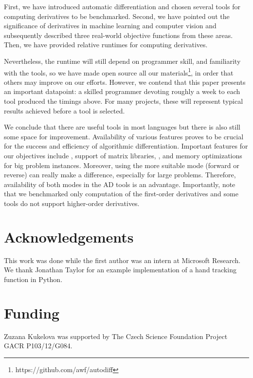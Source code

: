 \documentclass[suppldata]{article}
\begin{document}
First, we have introduced automatic differentiation and chosen several tools for computing derivatives to be benchmarked. Second, we have pointed out the significance of derivatives in machine learning and computer vision and subsequently described three real-world objective functions from these areas. Then, we have provided relative runtimes for computing derivatives.

Nevertheless, the runtime will still depend on programmer skill, and familiarity with the tools, so we have made open source all our materials\footnote{https://github.com/awf/autodiff}, in order that others may improve on our efforts.    However, we contend that this paper presents an important datapoint: a skilled programmer devoting roughly a week to each tool produced the timings above.  For many projects, these will represent typical results achieved before a tool is selected.

We conclude that there are useful tools in most languages but there is also still some space for improvement. Availability of various features proves to be crucial for the success and efficiency of algorithmic differentiation. Important features for our objectives include , support of matrix libraries, , and memory optimizations for big problem instances. Moreover, using the more suitable mode (forward or reverse) can really make a difference, especially for large problems. Therefore, availability of both modes in the AD tools is an advantage.
Importantly, note that we benchmarked only computation of the first-order derivatives and some tools do not support higher-order derivatives.

\section*{Acknowledgements}

This work was done while the first author was an intern at Microsoft Research.  
We thank Jonathan Taylor for an example implementation of a hand tracking function in Python.

\section*{Funding}

Zuzana Kukelova was supported by The Czech Science Foundation Project GACR P103/12/G084.



\end{document}
